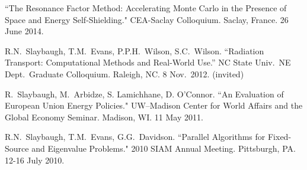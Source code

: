 \begin{bibsection}


\item ``The Resonance Factor Method: Accelerating Monte Carlo in the Presence of Space and Energy Self-Shielding." CEA-Saclay Colloquium. Saclay, France. 26 June 2014.



\item R.N.\ Slaybaugh, T.M.\ Evans, P.P.H.\ Wilson, S.C.\ Wilson. ``Radiation Transport: Computational Methods and Real-World Use.'' NC State Univ.\ NE Dept.\ Graduate Colloquium. Raleigh, NC. 8 Nov.\ 2012. (invited)


\item R.\ Slaybaugh, M.\ Arbidze, S. Lamichhane, D. O'Connor. ``An Evaluation of European Union Energy Policies." UW--Madison Center for World Affairs and the Global Economy Seminar. Madison, WI. 11 May 2011.


\item R.N.\ Slaybaugh, T.M.\ Evans, G.G.\ Davidson. ``Parallel Algorithms for Fixed-Source and Eigenvalue Problems." 2010 SIAM Annual Meeting. Pittsburgh, PA. 12-16 July 2010.



\end{bibsection}


